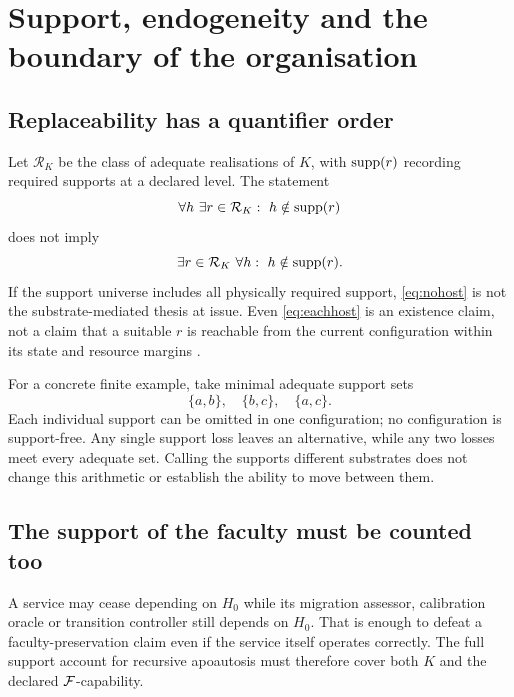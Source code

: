 \section{Support, endogeneity and the boundary of the organisation}
\label{sec:support}

\subsection{Replaceability has a quantifier order}

Let \(\mathcal R_K\) be the class of adequate realisations of \(K\), with \(\operatorname{supp}(r)\) recording required supports at a declared level. The statement
\begin{equation}
\forall h\ \exists r\in\mathcal R_K:\ h\notin\supp(r)
\label{eq:eachhost}
\end{equation}
does not imply
\begin{equation}
\exists r\in\mathcal R_K\ \forall h:\ h\notin\supp(r).
\label{eq:nohost}
\end{equation}
If the support universe includes all physically required support, \eqref{eq:nohost} is not the substrate-mediated thesis at issue. Even \eqref{eq:eachhost} is an existence claim, not a claim that a suitable \(r\) is reachable from the current configuration within its state and resource margins \cite[\S15]{LM3}.

For a concrete finite example, take minimal adequate support sets
\begin{equation}
\{a,b\},\quad\{b,c\},\quad\{a,c\}.
\end{equation}
Each individual support can be omitted in one configuration; no configuration is support-free. Any single support loss leaves an alternative, while any two losses meet every adequate set. Calling the supports different substrates does not change this arithmetic or establish the ability to move between them.

\subsection{The support of the faculty must be counted too}

A service may cease depending on \(H_0\) while its migration assessor, calibration oracle or transition controller still depends on \(H_0\). That is enough to defeat a faculty-preservation claim even if the service itself operates correctly. The full support account for recursive apoautosis must therefore cover both \(K\) and the declared \(\mathcal F\)-capability.

